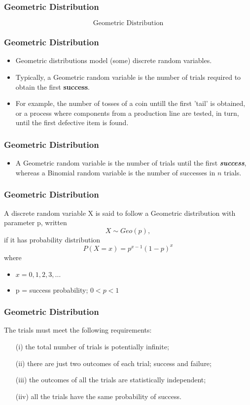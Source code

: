 \documentclass[IntroMain.tex]{subfiles}
\begin{document}
\begin{frame}
	\frametitle{Geometric Distribution}
	\Large
\[	\mbox{Geometric Distribution}\]
\end{frame}
\begin{frame}
	\frametitle{Geometric Distribution}
	\Large
	\begin{itemize}
		
		\item Geometric distributions model (some) discrete random variables.
		\item  Typically, a Geometric random variable is the number of trials required to obtain the first \textbf{success}.
		\item For example, the number of tosses of a coin untill the first 'tail' is obtained, or a process where components from a production line are tested, in turn, until the first defective item is found.
		
	\end{itemize}
\end{frame}
\begin{frame}
	\frametitle{Geometric Distribution}
	\Large
	\begin{itemize}
		\item A Geometric random variable is the number of trials until the first \textit{\textbf{success}}, whereas a Binomial random variable is the number of successes in $n$ trials.
	\end{itemize}
\end{frame}
\begin{frame}
	\frametitle{Geometric Distribution}
	\Large
	A discrete random variable X is said to follow a Geometric distribution with parameter p, written \[X \sim Geo(p),\] if it has probability distribution
	\[P(X=x) = p^{x-1}(1-p)^x\]
	where
	\begin{itemize}
		\item $x = 0, 1, 2, 3, \ldots$
		\item p = success probability; $0 < p < 1$
	\end{itemize}
	
\end{frame}
\begin{frame}
	\frametitle{Geometric Distribution}
	\Large
	The trials must meet the following requirements:
	
	\begin{itemize}
		\item[(i)] the total number of trials is potentially infinite;
		\item[(ii)] there are just two outcomes of each trial; success and failure;
		\item[(iii)] the outcomes of all the trials are statistically independent;
		\item[(iiv)] all the trials have the same probability of success.
	\end{itemize}
	
\end{frame}
\end{document}
